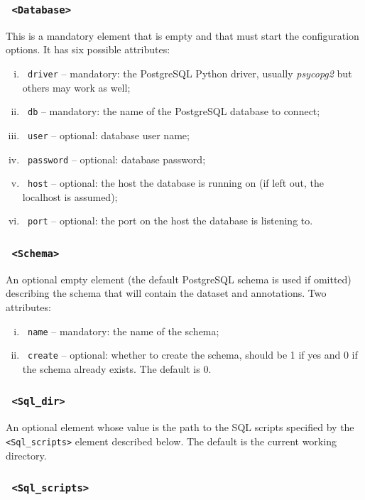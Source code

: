 \documentclass[10pt,letter]{article}
\begin{document}
\subsubsection*{\texttt{ <Database>}}

This is a mandatory element that is empty and that must start the configuration options. It has six possible attributes:
\begin{enumerate}[(i)]
\item \texttt{ driver} -- mandatory: the PostgreSQL Python driver, usually {\it psycopg2} but others may work as well;
\item \texttt{ db} -- mandatory: the name of the PostgreSQL database to connect;
\item \texttt{ user} -- optional: database user name;
\item \texttt{ password} -- optional: database password;
\item \texttt{ host} -- optional: the host the database is running on (if left out, the localhost is assumed);
\item \texttt{ port} -- optional: the port on the host the database is listening to.
\end{enumerate}

\subsubsection*{\texttt{ <Schema>}}

An optional empty element (the default PostgreSQL schema is used if omitted) describing the schema that will contain the dataset and annotations. Two attributes:
\begin{enumerate}[(i)]
\item \texttt{ name} -- mandatory: the name of the schema;
\item \texttt{ create} -- optional: whether to create the schema, should be 1 if yes and 0 if the schema already exists. The default is 0.
\end{enumerate}

\subsubsection*{\texttt{ <Sql\_dir>}}

An optional element whose value is the path to the SQL scripts specified by the \texttt{ <Sql\_scripts>} element described below. The default is the current working directory.

\subsubsection*{\texttt{ <Sql\_scripts>}}
\end{document}
